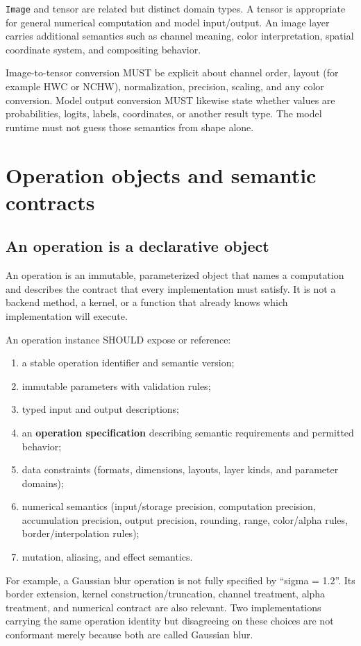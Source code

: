 \documentclass[11pt,a4paper,oneside]{article}
\newcommand{\Image}{\texttt{Image}}
\begin{document}
\Image{} and tensor are related but distinct domain types. A tensor is appropriate for general numerical computation and model input/output. An image layer carries additional semantics such as channel meaning, color interpretation, spatial coordinate system, and compositing behavior.

Image-to-tensor conversion MUST be explicit about channel order, layout (for example HWC or NCHW), normalization, precision, scaling, and any color conversion. Model output conversion MUST likewise state whether values are probabilities, logits, labels, coordinates, or another result type. The model runtime must not guess those semantics from shape alone.

\section{Operation objects and semantic contracts}

\subsection{An operation is a declarative object}

An operation is an immutable, parameterized object that names a computation and describes the contract that every implementation must satisfy. It is not a backend method, a kernel, or a function that already knows which implementation will execute.

An operation instance SHOULD expose or reference:
\begin{enumerate}
  \item a stable operation identifier and semantic version;
  \item immutable parameters with validation rules;
  \item typed input and output descriptions;
  \item an \textbf{operation specification} describing semantic requirements and permitted behavior;
  \item data constraints (formats, dimensions, layouts, layer kinds, and parameter domains);
  \item numerical semantics (input/storage precision, computation precision, accumulation precision, output precision, rounding, range, color/alpha rules, border/interpolation rules);
  \item mutation, aliasing, and effect semantics.
\end{enumerate}

For example, a Gaussian blur operation is not fully specified by \textquotedblleft{}sigma = 1.2\textquotedblright{}. Its border extension, kernel construction/truncation, channel treatment, alpha treatment, and numerical contract are also relevant. Two implementations carrying the same operation identity but disagreeing on these choices are not conformant merely because both are called Gaussian blur.
\end{document}
